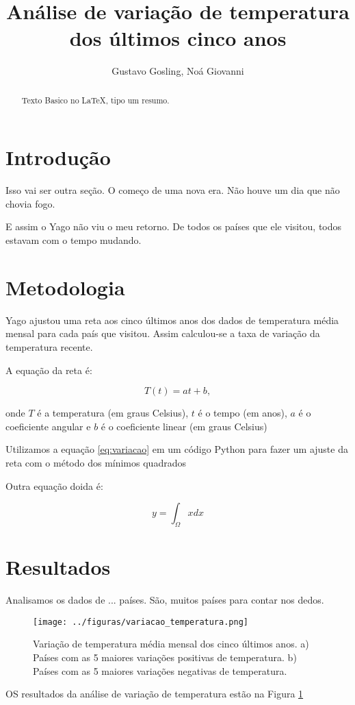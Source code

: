 \documentclass{article}
\begin{document}
\title{Análise de variação de temperatura dos últimos cinco anos}
\author{Gustavo Gosling, Noá Giovanni}

\maketitle


\begin{abstract}
Texto Basico no LaTeX, tipo um resumo.

\end{abstract}

\section{Introdução}

Isso vai ser outra seção.
O começo de uma nova era. Não houve um dia que não chovia fogo.

E assim o Yago não viu o meu retorno. De todos os países que ele visitou,
 todos estavam com o tempo mudando.

\section{Metodologia}

Yago ajustou uma reta aos cinco últimos anos dos dados de temperatura
 média mensal para cada país que visitou.
Assim calculou-se a taxa de variação da temperatura recente.

A equação da reta é:

\begin{equation}
T(t)= a t + b,
\label{eq:variacao}
\end{equation}

\noindent
onde $T$ é a temperatura (em graus Celsius), $t$ é o tempo (em anos),
 $a$ é o coeficiente angular e $b$ é o coeficiente linear (em graus Celsius)

Utilizamos a equação \ref{eq:variacao} em um código Python para fazer um ajuste da reta com
o método dos mínimos quadrados

Outra equação doida é:

\begin{equation}
y = \int_\Omega x dx
\end{equation}

\section{Resultados}

Analisamos os dados de ... países. São, muitos países para contar nos dedos.

\begin{figure}[!tb]
    \centering
    \texttt{[image: ../figuras/variacao\_temperatura.png]}
    \caption{
    Variação de temperatura média mensal dos cinco últimos anos.
    a) Países com as 5 maiores variações positivas de temperatura.
    b) Países com as 5 maiores variações negativas de temperatura.
    }
    \label{fig:variacao}
\end{figure}

OS resultados da análise de variação de temperatura estão na Figura \ref{fig:variacao}
\end{document}

